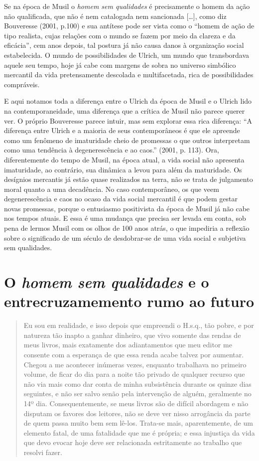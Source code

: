 Se na época de Musil o \emph{homem sem qualidades} é precisamente o
homem da ação não qualificada, que não é nem catalogada nem sancionada
{[}\ldots{}{]}, como diz Bouveresse (2001, p.100) e sua antítese pode
ser vista como o ``homem de ação de tipo realista, cujas relações com o
mundo se fazem por meio da clareza e da eficácia'', cem anos depois, tal
postura já não causa danos à organização social estabelecida. O mundo de
possibilidades de Ulrich, um mundo que transbordava aquele seu tempo,
hoje já cabe com margens de sobra no universo simbólico mercantil da
vida pretensamente descolada e multifacetada, rica de possibilidades
compráveis.

E aqui notamos toda a diferença entre o Ulrich da época de Musil e o
Ulrich lido na contemporaneidade, uma diferença que a crítica de Musil
não parece querer ver. O próprio Bouveresse parece intuir, mas sem
explorar essa rica diferença: ``A diferença entre Ulrich e a maioria de
seus contemporâneos é que ele apreende como um fenômeno de imaturidade
cheio de promessas o que outros interpretam como uma tendência à
degenerescência e ao caos.'' (2001, p. 113). Ora, diferentemente do
tempo de Musil, na época atual, a vida social não apresenta imaturidade,
ao contrário, sua dinâmica a levou para além da maturidade. Os desígnios
mercantis já estão quase realizados na terra, não se trata de julgamento
moral quanto a uma decadência. No caso contemporâneo, os que veem
degenerescência e caos no ocaso da vida social mercantil é que podem
gestar novas promessas, porque o entusiasmo positivista da época de
Musil já não cabe nos tempos atuais. E essa é uma mudança que precisa
ser levada em conta, sob pena de lermos Musil com os olhos de 100 anos
atrás, o que impediria a reflexão sobre o significado de um século de
desdobrar-se de uma vida social e subjetiva sem qualidades.

\section{O \emph{homem sem qualidades} e o entrecruzamemento rumo ao futuro}

\begin{quote}
Eu sou em realidade, e isso depois que empreendi o H.s.q., tão pobre, e
por natureza tão inapto a ganhar dinheiro, que vivo somente das rendas
de meus livros, mais exatamente dos adiantamentos que meu editor me
consente com a esperança de que essa renda acabe talvez por aumentar.
Chegou a me acontecer inúmeras vezes, enquanto trabalhava no primeiro
volume, de ficar do dia para a noite tão privado de qualquer recurso que
não via mais como dar conta de minha subsistência durante os quinze dias
seguintes, e não ser salvo senão pela intervenção de alguém, geralmente
no 14º dia. Consequentemente, se meus livros são de difícil abordagem e
não disputam os favores dos leitores, não se deve ver nisso arrogância
da parte de quem passa muito bem sem lê-los. Trata-se mais,
aparentemente, de um elemento fatal, de uma fatalidade que me é própria;
e essa injustiça da vida que devo evocar hoje deve ser relacionada
estritamente ao trabalho que resolvi fazer.
\end{quote}

